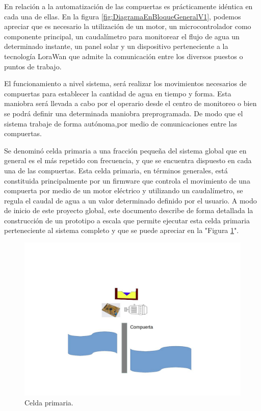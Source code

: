 En relación a la automatización de las compuertas es prácticamente idéntica en cada una de ellas. En la figura \ref{fig:DiagramaEnBloqueGeneralV1}, podemos apreciar que es necesario la utilización de un motor, un microcontrolador como componente principal, un caudalímetro  para monitorear el flujo de agua un determinado instante, un panel solar y un dispositivo perteneciente a la tecnología LoraWan que admite la comunicación entre los diversos puestos o puntos de trabajo.

El funcionamiento a nivel sistema, será realizar los movimientos necesarios de compuertas para establecer la cantidad de agua en tiempo y forma. Esta maniobra será llevada a cabo por el operario desde el centro de monitoreo o bien se podrá definir una determinada maniobra preprogramada. De modo que el sistema trabaje de forma autónoma,por medio de comunicaciones entre las compuertas.  


Se denominó celda primaria a una fracción pequeña del sistema global que en general es el más repetido con frecuencia, y que se encuentra dispuesto en cada una de las compuertas.
Esta celda primaria, en términos generales, está constituida principalmente por un firmware que controla el movimiento de una compuerta por medio de un motor eléctrico y utilizando un caudalímetro, se regula el caudal de agua a un valor determinado definido por el usuario.
A modo de inicio de este proyecto global, este documento describe de forma detallada la construcción de un prototipo a escala que permite ejecutar esta celda primaria perteneciente al sistema completo y que se puede apreciar en la "Figura \ref{fig:SistemaBase}".
\begin{figure}[htpb]
\centering
\includegraphics[scale=.40]{./Figures/SistemaBase-V2.jpg}
\caption{Celda primaria.}
\label{fig:SistemaBase}
\end{figure}



